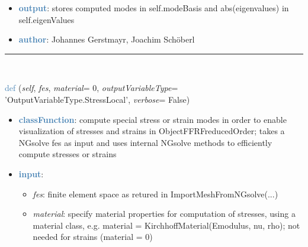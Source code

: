 \begin{itemize}[leftmargin=1.4cm]
\begin{itemize}[leftmargin=1.4cm]
\begin{itemize}[leftmargin=1.4cm]
\begin{itemize}[leftmargin=0.5cm]
\begin{itemize}[leftmargin=1.4cm]
\begin{itemize}[leftmargin=1.4cm]
\begin{itemize}[leftmargin=1.4cm]
\begin{itemize}[leftmargin=0.5cm]
\begin{itemize}[leftmargin=0.7cm]
\begin{itemize}[leftmargin=1.2cm]
\item[]{\it nEigenModes}: number of eigen modes in addition to static modes (may be zero for RBE2 computationMode); eigen modes are computed for the case where all rigid body motions at boundaries are fixed; only smallest nEigenModes absolute eigenvalues are considered
\item[]{\it maxEigensolveIterations}: maximum number of iterations for iterative eigensolver; default=40
\item[]{\it verbose}: if True, output some relevant information during solving
\end{itemize}
\item[--]\textcolor{steelblue}{\bf output}: stores computed modes in self.modeBasis and abs(eigenvalues) in self.eigenValues
\item[--]\textcolor{steelblue}{\bf author}: Johannes Gerstmayr, Joachim Schöberl
\vspace{12pt}\end{itemize}
%
\noindent\rule{8cm}{0.75pt}\vspace{1pt} \\ 
\begin{flushleft}
\noindent \textcolor{steelblue}{def {\bf {}}}\label{sec:FEM:FEMinterface:ComputePostProcessingModesNGsolve}
({\it self}, {\it fes}, {\it material}= 0, {\it outputVariableType}= 'OutputVariableType.StressLocal', {\it verbose}= False)
\end{flushleft}
\setlength{\itemindent}{0.7cm}
\begin{itemize}[leftmargin=0.7cm]
\item[--]\textcolor{steelblue}{\bf classFunction}: compute special stress or strain modes in order to enable visualization of stresses and strains in ObjectFFRFreducedOrder; takes a NGsolve fes as input and uses internal NGsolve methods to efficiently compute stresses or strains
\item[--]\textcolor{steelblue}{\bf input}: \vspace{-6pt}
\begin{itemize}[leftmargin=1.2cm]
\setlength{\itemindent}{-0.7cm}
\item[]{\it fes}: finite element space as retured in ImportMeshFromNGsolve(...)
\item[]{\it material}: specify material properties for computation of stresses, using a material class, e.g. material = KirchhoffMaterial(Emodulus, nu, rho); not needed for strains (material = 0)

\end{itemize}
\end{itemize}
\end{itemize}
\end{itemize}
\end{itemize}
\end{itemize}
\end{itemize}
\end{itemize}
\end{itemize}
\end{itemize}
